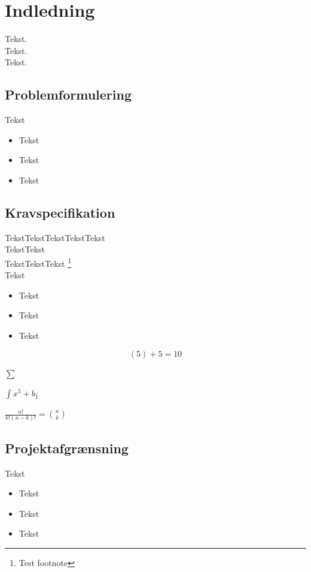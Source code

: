 \section{Indledning}

Tekst.\\

Tekst.\\

Tekst.\\




\subsection{Problemformulering}

Tekst
\begin{itemize}
	\item Tekst
	\item Tekst
	\item Tekst
\end{itemize}

\subsection{Kravspecifikation}

TekstTekstTekstTekstTekst\\
TekstTekst\\
TekstTekstTekst \footnote{Test footnote}\\
Tekst

\begin{itemize}
	\item Tekst
	\item Tekst
	\item Tekst

\end{itemize}

\[(5)+5=10\]


$\displaystyle \sum$


$\displaystyle \int x^5+b_1$


$\frac{n!}{k!(n-k)!} = \binom{n}{k}$

\subsection{Projektafgrænsning}

Tekst

\begin{itemize}
	\item Tekst
	\item Tekst
	\item Tekst
\end{itemize}

